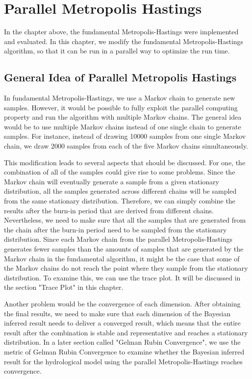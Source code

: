 \chapter{Parallel Metropolis Hastings}
In the chapter above, the fundamental Metropolis-Hastings were implemented and evaluated. In this chapter, we modify the fundamental Metropolis-Hastings algorithm, so that it can be run in a parallel way to optimize the run time.

\section{General Idea of Parallel Metropolis Hastings}
In fundamental Metropolis-Hastings, we use a Markov chain to generate new samples. However, it would be possible to fully exploit the parallel computing property and run the algorithm with multiple Markov chains. The general idea would be to use multiple Markov chains instead of one single chain to generate samples. For instance, instead of drawing 10000 samples from one single Markov chain, we draw 2000 samples from each of the five Markov chains simultaneously. 

This modification leads to several aspects that should be discussed. For one, the combination of all of the samples could give rise to some problems. Since the Markov chain will eventually generate a sample from a given stationary distribution, all the samples generated across different chains will be sampled from the same stationary distribution. Therefore, we can simply combine the results after the burn-in period that are derived from different chains. Nevertheless, we need to make sure that all the samples that are generated from the chain after the burn-in period need to be sampled from the stationary distribution. Since each Markov chain from the parallel Metropolis-Hastings generates fewer samples than the amounts of samples that are generated by the Markov chain in the fundamental algorithm, it might be the case that some of the Markov chains do not reach the point where they sample from the stationary distribution. To examine this, we can use the trace plot.\cite{mcmc_practice} It will be discussed in the section "Trace Plot" in this chapter.

Another problem would be the convergence of each dimension. After obtaining the final results, we need to make sure that each dimension of the Bayesian inferred result needs to deliver a converged result, which means that the entire result after the combination is stable and representative and reaches a stationary distribution. In a later section called "Gelman Rubin Convergence", we use the metric of Gelman Rubin Convergence to examine whether the Bayesian inferred result for the hydrological model using the parallel Metropolis-Hastings reaches convergence.

